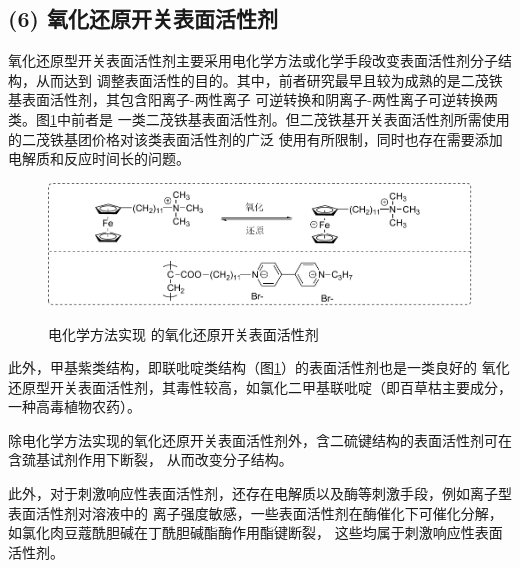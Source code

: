 \documentclass[bachelor,winfonts,replaceperiod]{jnuthesis}
\begin{document}
    \subsection*{(6) 氧化还原开关表面活性剂}
    氧化还原型开关表面活性剂主要采用电化学方法或化学手段改变表面活性剂分子结构，从而达到
    调整表面活性的目的。其中，前者研究最早且较为成熟的是二茂铁基表面活性剂，其包含阳离子-两性离子
    可逆转换和阴离子-两性离子可逆转换两类\cite{李云霞2011}。图\ref{fig:switchable-redox-cp2fe}中前者是
    一类二茂铁基表面活性剂。但二茂铁基开关表面活性剂所需使用的二茂铁基团价格对该类表面活性剂的广泛
    使用有所限制，同时也存在需要添加电解质和反应时间长的问题。
    \begin{figure}[htbp]
        \centering
        \includegraphics[scale=0.8]{Figure/switchable-cp2fe.pdf}\\
        \caption{电化学方法实现 的氧化还原开关表面活性剂}\label{fig:switchable-redox-cp2fe}
    \end{figure}
    
    此外，甲基紫类结构，即联吡啶类结构（图\ref{fig:switchable-redox-cp2fe}）的表面活性剂也是一类良好的
    氧化还原型开关表面活性剂，其毒性较高，如氯化二甲基联吡啶（即百草枯主要成分，一种高毒植物农药）。
    
    除电化学方法实现的氧化还原开关表面活性剂外，含二硫键结构的表面活性剂可在含巯基试剂作用下断裂，
    从而改变分子结构。
    
    此外，对于刺激响应性表面活性剂，还存在电解质以及酶等刺激手段，例如离子型表面活性剂对溶液中的
    离子强度敏感，一些表面活性剂在酶催化下可催化分解，如氯化肉豆蔻酰胆碱在丁酰胆碱酯酶作用酯键断裂\cite{guo2012}，
    这些均属于刺激响应性表面活性剂。
    
%    
    
    
\end{document}
